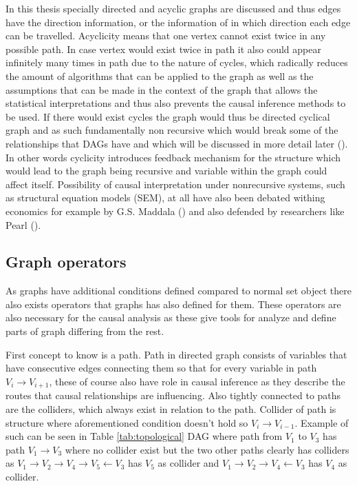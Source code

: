 \documentclass[main=english,12pt,a4paper,pdftex,econ,utf8]{aaltothesis}
\begin{document}
In this thesis specially directed and acyclic graphs are discussed and thus edges have the direction information, or the information of in which direction each edge can be travelled. Acyclicity means that one vertex cannot exist twice in any possible path. In case vertex would exist twice in path it also could appear infinitely many times in path due to the nature of cycles, which radically reduces the amount of algorithms that can be applied to the graph as well as the assumptions that can be made in the context of the graph that allows the statistical interpretations and thus also prevents the causal inference methods to be used. If there would exist cycles the graph would thus be directed cyclical graph and as such fundamentally non recursive which would break some of the relationships that DAGs have and which will be discussed in more detail later (\cite{Heckman2015}). In other words cyclicity introduces feedback mechanism for the structure which would lead to the graph being recursive and variable within the graph could affect itself. Possibility of causal interpretation under nonrecursive systems, such as  structural equation models (SEM), at all have also been debated withing economics for example by G.S. Maddala (\cite{Maddala1986}) and also defended by researchers like Pearl (\cite{Pearl1998}).

\subsection{Graph operators}

As graphs have additional conditions defined compared to normal set object there also exists operators that graphs has also defined for them. These operators are also necessary for the causal analysis as these give tools for analyze and define parts of graph differing from the rest.

First concept to know is a path. Path in directed graph consists of variables that have consecutive edges connecting them so that for every variable in path $V_{i}\rightarrow V_{i+1}$, these of course also have role in causal inference as they describe the routes that causal relationships are influencing. Also tightly connected to paths are the colliders, which always exist in relation to the path. Collider of path is structure where aforementioned condition doesn't hold so $V_{i}\rightarrow V_{i-1}$. Example of such can be seen in Table \ref{tab:topological} DAG where path from $V_{1}$ to $V_{3}$ has path $V_{1}\rightarrow V_{3}$ where no collider exist but the two other paths clearly has colliders as $V_{1}\rightarrow V_{2}\rightarrow V_{4}\rightarrow V_{5}\leftarrow V_{3}$ has $V_{5}$ as collider and $V_{1}\rightarrow V_{2}\rightarrow V_{4}\leftarrow V_{3}$ has $V_{4}$ as collider.
\end{document}
